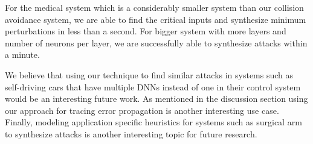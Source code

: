 For the medical system which is a considerably smaller system than our collision avoidance system, we are able to find the critical inputs and synthesize minimum perturbations in less than a second. For bigger system with more layers and number of neurons per layer, we are successfully able to synthesize attacks within a minute. 

We believe that using our technique to find similar attacks in systems such as self-driving cars that have multiple DNNs instead of one in their control system would be an interesting future work. As mentioned in the discussion section using our approach for tracing error propagation is another interesting use case. Finally, modeling application specific heuristics for systems such as surgical arm to synthesize attacks is another interesting topic for future research. 
\fi 
%